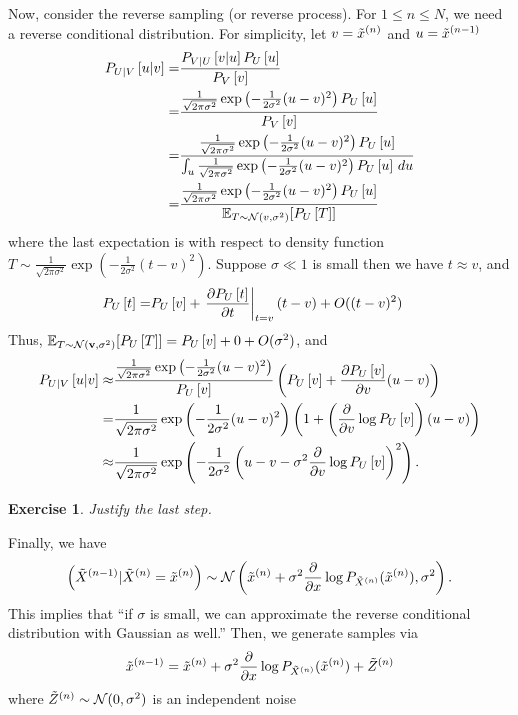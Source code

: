 \documentclass[11pt]{article}
\newtheorem{exercise}{Exercise}
\begin{document}
Now, consider the reverse sampling (or reverse process).
For $1\leq n\leq N$, we need a reverse conditional distribution.
For simplicity, let $v = \tilde{x}^{(n)}$ and $u = \tilde{x}^{(n-1)}$
\begin{align}
     P_{U|V}\left[u|v\right]
     =& \frac{P_{V|U}\left[v|u\right] P_U\left[u\right]}{P_V\left[v\right]}\\
     =& \frac{\frac{1}{\sqrt{2\pi\sigma^2}}\exp\left(-\frac{1}{2\sigma^2}(u-v)^2\right) P_U\left[u\right]}{P_V\left[v\right]}\\
     =& \frac{\frac{1}{\sqrt{2\pi\sigma^2}}\exp\left(-\frac{1}{2\sigma^2}(u-v)^2\right) P_U\left[u\right]}
     {\int_{u}\frac{1}{\sqrt{2\pi\sigma^2}}\exp\left(-\frac{1}{2\sigma^2}(u-v)^2\right) P_U\left[u\right] \,du}\\
     =& \frac{\frac{1}{\sqrt{2\pi\sigma^2}}\exp\left(-\frac{1}{2\sigma^2}(u-v)^2\right) P_U\left[u\right]}
     {\mathbb{E}_{T\sim {\cal N}(v, \sigma^2)} [P_U\left[T\right]] }
\end{align}
where the last expectation is with respect to density function $T\sim\frac{1}{\sqrt{2\pi\sigma^2}}\exp\left(-\frac{1}{2\sigma^2}(t-v)^2\right)$.
Suppose $\sigma \ll 1$ is small then we have $t\approx v$, and
\begin{align}
    P_U\left[t\right] =& P_U\left[v\right] +  \left.\frac{\partial P_U\left[t\right]}{\partial t}\right|_{t=v} (t-v) + O((t-v)^2)
\end{align}
Thus, $\mathbb{E}_{T\sim {\cal N}({\bf v}, \sigma^2 )} [P_U\left[T\right]] = P_U\left[v\right] + 0 + O(\sigma^2)$, and
\begin{align}
     P_{U|V}\left[u|v\right]
     \approx& \frac{\frac{1}{\sqrt{2\pi\sigma^2}}\exp\left(-\frac{1}{2\sigma^2}(u-v)^2\right) } {P_U\left[v\right]}
     \left( P_U\left[v\right] + \frac{\partial P_U\left[v\right]}{\partial v}(u-v)\right)\\
     =& \frac{1}{\sqrt{2\pi\sigma^2}}\exp\left(-\frac{1}{2\sigma^2}(u-v)^2\right) 
     \left( 1 + \left(\frac{\partial}{\partial v}\log P_U\left[v\right]\right) (u-v)\right)\\
     \approx& \frac{1}{\sqrt{2\pi\sigma^2}}\exp\left(-\frac{1}{2\sigma^2}\left(u-v - \sigma^2\frac{\partial}{\partial v}\log P_U\left[v\right]\right)^2\right).
\end{align}
\begin{exercise}
    Justify the last step.
\end{exercise}
Finally, we have
\begin{align}
    \left(\tilde{X}^{(n-1)} | \tilde{X}^{(n)}=\tilde{x}^{(n)} \right)\sim {\cal N}\left(\tilde{x}^{(n)} 
    + \sigma^2 \frac{\partial}{\partial x} \log P_{\tilde{X}^{(n)}}(\tilde{x}^{(n)}), \sigma^2 \right).
\end{align}
This implies that ``if $\sigma$ is small, we can approximate the reverse conditional distribution with Gaussian as well.''
Then, we generate samples via
    \begin{align}
        \tilde{x}^{(n-1)} = \tilde{x}^{(n)} + \sigma^2 \frac{\partial}{\partial x} \log P_{\tilde{X}^{(n)}} (\tilde{x}^{(n)}) + \tilde{Z}^{(n)}
    \end{align}
where $\tilde{Z}^{(n)}\sim{\cal N}(0, \sigma^2)$ is an independent noise
\end{document}
